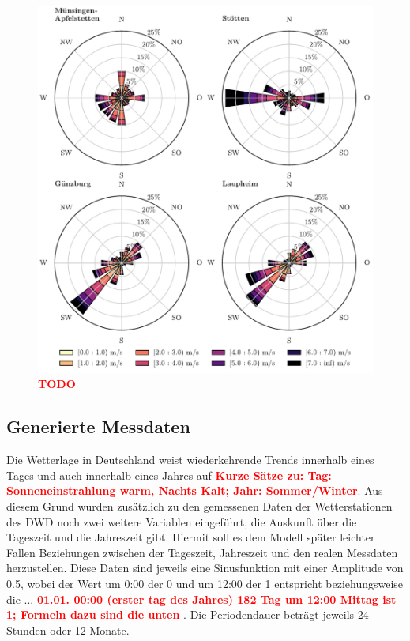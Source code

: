 \documentclass[
12pt, %
toc=listofnumbered, %
toc=chapterentrydotfill, %
numbers=noenddot, %
captions=tableheading, %
]{scrreprt}
\let\Oldsubsection\subsection
\renewcommand{\subsection}{\FloatBarrier\Oldsubsection}
\newcommand{\highlight}[1]{\textbf{\textcolor{red}{#1}}}
\begin{document}
\begin{figure}[tph]
	\begin{center}
		\includegraphics[]{./images/windroses.pdf}
		\caption{\highlight{{TODO}}}
		\label{fig:windroses}
	\end{center}
\end{figure}


\subsection{Generierte Messdaten}
Die Wetterlage in Deutschland weist wiederkehrende Trends innerhalb eines Tages und auch innerhalb eines Jahres auf \highlight{Kurze Sätze zu: Tag: Sonneneinstrahlung warm, Nachts Kalt; Jahr: Sommer/Winter}. Aus diesem Grund wurden zusätzlich zu den 
gemessenen Daten der Wetterstationen des DWD noch zwei weitere Variablen eingeführt, die Auskunft über die Tageszeit und die Jahreszeit gibt. Hiermit soll es dem Modell später leichter Fallen Beziehungen zwischen der Tageszeit, Jahreszeit und den realen Messdaten herzustellen. Diese Daten sind jeweils eine Sinusfunktion mit einer Amplitude von 0.5, wobei der Wert um 0:00 der 0 und um 12:00 der 1 entspricht beziehungsweise die ... \highlight{01.01. 00:00 (erster tag des Jahres) 182 Tag um 12:00 Mittag ist 1; Formeln dazu sind die unten} . Die Periodendauer beträgt jeweils 24 Stunden oder 12 Monate. \\
\end{document}
